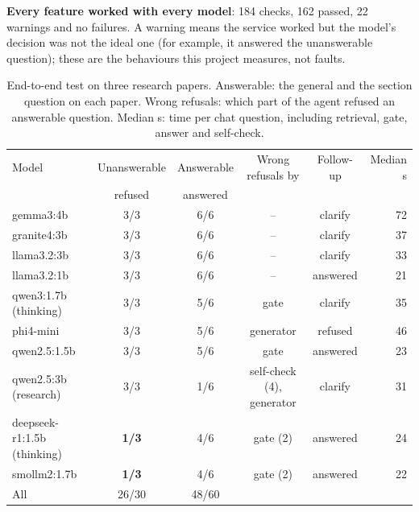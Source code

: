 \textbf{Every feature worked with every model}: 184 checks, 162 passed, 22 warnings and no failures. A warning means the service worked but the model's decision was not the ideal one (for example, it answered the unanswerable question); these are the behaviours this project measures, not faults.

\begin{table}[H]
\centering\small
\begin{tabular}{@{}lccccr@{}}
\toprule
Model & Unanswerable & Answerable & Wrong refusals by & Follow-up & Median s \\
 & refused & answered & & & \\
\midrule
gemma3:4b & 3/3 & 6/6 & -- & clarify & 72 \\
granite4:3b & 3/3 & 6/6 & -- & clarify & 37 \\
llama3.2:3b & 3/3 & 6/6 & -- & clarify & 33 \\
llama3.2:1b & 3/3 & 6/6 & -- & answered & 21 \\
qwen3:1.7b (thinking) & 3/3 & 5/6 & gate & clarify & 35 \\
phi4-mini & 3/3 & 5/6 & generator & refused & 46 \\
qwen2.5:1.5b & 3/3 & 5/6 & gate & answered & 23 \\
qwen2.5:3b (research) & 3/3 & 1/6 & self-check (4), generator & clarify & 31 \\
deepseek-r1:1.5b (thinking) & \textbf{1/3} & 4/6 & gate (2) & answered & 24 \\
smollm2:1.7b & \textbf{1/3} & 4/6 & gate (2) & answered & 22 \\
\midrule
All & 26/30 & 48/60 & & & \\
\bottomrule
\end{tabular}
\caption{End-to-end test on three research papers. Answerable: the general and the section question on each paper. Wrong refusals: which part of the agent refused an answerable question. Median s: time per chat question, including retrieval, gate, answer and self-check.}
\label{tab:smoke}
\end{table}

